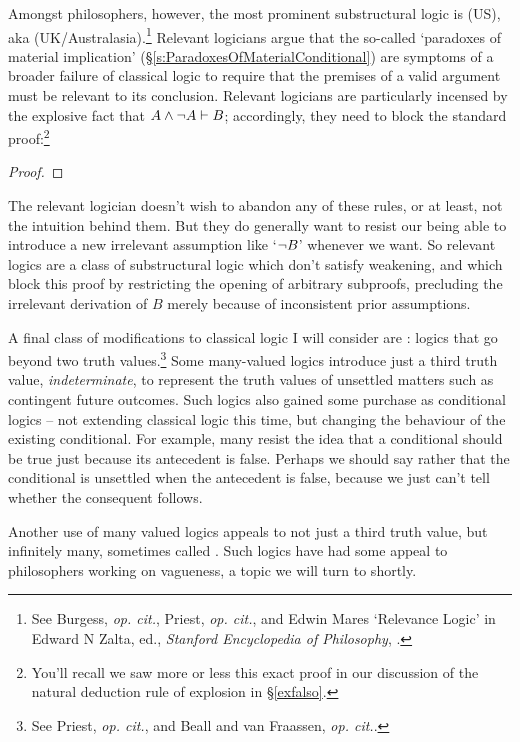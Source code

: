 Amongst philosophers, however, the most prominent substructural logic is  (US), aka  (UK/Australasia).\footnote{See Burgess, \emph{op. cit.}, Priest, \emph{op. cit.}, and Edwin Mares `Relevance Logic' in Edward N Zalta, ed., \emph{Stanford Encyclopedia of Philosophy}, .} Relevant logicians argue that the so-called `paradoxes of material implication' (§\ref{s:ParadoxesOfMaterialConditional}) are symptoms of a broader failure of classical logic to require that the premises of a valid argument must be relevant to its conclusion. Relevant logicians are particularly incensed by the explosive fact that $A \wedge \neg A \vdash B$; accordingly, they need to block the standard proof:\footnote{You'll recall we saw more or less this exact proof in our discussion of the natural deduction rule of explosion in §\ref{exfalso}.} \begin{proof}
	\open
	\close
\end{proof} The relevant logician doesn't wish to abandon any of these rules, or at least, not the intuition behind them. But they do generally want to resist our being able to introduce a new irrelevant assumption like `$\neg B$' whenever we want. So relevant logics are a class of substructural logic which don't satisfy weakening, and which block this proof by restricting the opening of arbitrary subproofs, precluding the irrelevant derivation of $B$ merely because of inconsistent prior assumptions. 

A final class of modifications to classical logic I will consider are : logics that go beyond two truth values.\footnote{See Priest, \emph{op. cit.}, and Beall and van Fraassen, \emph{op. cit.}.} Some many-valued logics introduce just a third truth value, \emph{indeterminate}, to represent the truth values of unsettled matters such as contingent future outcomes. Such logics also gained some purchase as conditional logics – not extending classical logic this time, but changing the behaviour of the existing conditional. For example, many resist the idea that a conditional should be true just because its antecedent is false. Perhaps we should say rather that the conditional is unsettled when the antecedent is false, because we just can't tell whether the consequent follows. 

Another use of many valued logics appeals to not just a third truth value, but infinitely many, sometimes called . Such logics have had some appeal to philosophers working on vagueness, a topic we will turn to shortly.

